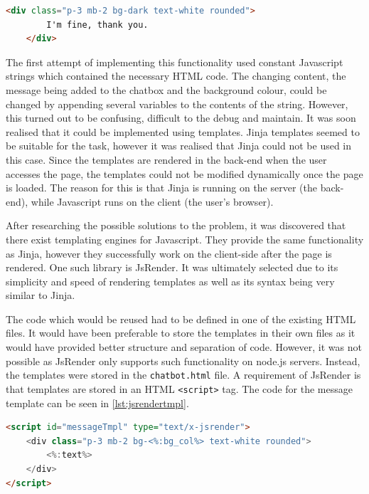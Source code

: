 \documentclass[12pt,a4paper]{article}
\newcommand{\captionstyle}[1] {
    \small{#1}
}
\begin{document}
\begin{lstlisting}[language=HTML, caption={\captionstyle{The HTML code used to create a chatbox message sent by the chatbot.}}, label={lst:msghtml}]
    <div class="p-3 mb-2 bg-dark text-white rounded">
        I'm fine, thank you.
    </div>
\end{lstlisting}

The first attempt of implementing this functionality used constant Javascript strings which contained the necessary HTML code. The changing content, the message being added to the chatbox and the background colour, could be changed by appending several variables to the contents of the string. However, this turned out to be confusing, difficult to the debug and maintain. It was soon realised that it could be implemented using templates. Jinja templates seemed to be suitable for the task, however it was realised that Jinja could not be used in this case. Since the templates are rendered in the back-end when the user accesses the page, the templates could not be modified dynamically once the page is loaded. The reason for this is that Jinja is running on the server (the back-end), while Javascript runs on the client (the user’s browser).

After researching the possible solutions to the problem, it was discovered that there exist templating engines for Javascript. They provide the same functionality as Jinja, however they successfully work on the client-side after the page is rendered. One such library is JsRender. It was ultimately selected due to its simplicity and speed of rendering templates as well as its syntax being very similar to Jinja. 

The code which would be reused had to be defined in one of the existing HTML files. It would have been preferable to store the templates in their own files as it would have provided better structure and separation of code. However, it was not possible as JsRender only supports such functionality on node.js servers. Instead, the templates were stored in the \texttt{chatbot.html} file. A requirement of JsRender is that templates are stored in an HTML \texttt{<script>} tag. The code for the message template can be seen in \cref{lst:jsrendertmpl}. 

\begin{lstlisting}[language=HTML, caption={\captionstyle{The code for the JsRender message template.}}, label={lst:jsrendertmpl}]
<script id="messageTmpl" type="text/x-jsrender">
    <div class="p-3 mb-2 bg-<%:bg_col%> text-white rounded">
        <%:text%>
    </div>
</script>
\end{lstlisting}
\end{document}
